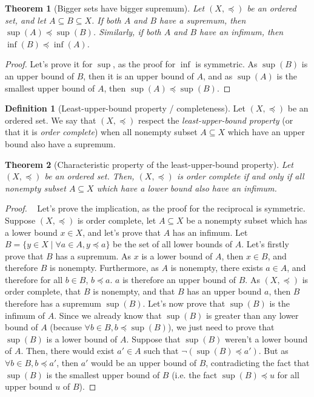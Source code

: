 \documentclass{article}
\newtheorem{theorem}{Theorem}[section]
\theoremstyle{definition}
\newtheorem{definition}{Definition}[section]
\theoremstyle{remark}
\theoremstyle{example}
\theoremstyle{notation}
\theoremstyle{axiom}
\begin{document}
\begin{theorem}[Bigger sets have bigger supremum] \label{thm:bigger-set-bigger-sup}
		Let $(X, \preceq)$ be an ordered set, and let $A \subseteq B \subseteq X$. If both $A$ and $B$ have a supremum, then $\sup(A) \preceq \sup(B)$. Similarly, if both $A$ and $B$ have an infimum, then $\inf(B) \preceq \inf(A)$.
\end{theorem}

\begin{proof}
		Let's prove it for $\sup$, as the proof for $\inf$ is symmetric. As $\sup(B)$ is an upper bound of $B$, then it is an upper bound of $A$, and as $\sup(A)$ is the smallest upper bound of $A$, then $\sup(A) \preceq \sup(B)$.
\end{proof}

\begin{definition}[Least-upper-bound property / completeness] %
		Let $(X, \preceq)$ be an ordered set. We say that $(X, \preceq)$ respect the \textit{least-upper-bound property} (or that it is \textit{order complete}) when all nonempty subset $A \subseteq X$ which have an upper bound also have a supremum.
\end{definition}

\begin{theorem}[Characteristic property of the least-upper-bound property]
		Let $(X, \preceq)$ be an ordered set. Then, $(X, \preceq)$ is order complete if and only if all nonempty subset $A \subseteq X$ which have a lower bound also have an infimum.
\end{theorem}

\begin{proof}~
		Let's prove the implication, as the proof for the reciprocal is symmetric. Suppose $(X, \preceq)$ is order complete, let $A \subseteq X$ be a nonempty subset which has a lower bound $x \in X$, and let's prove that $A$ has an infimum. Let $B = \{y \in X \mid \forall a \in A, y \preceq a\}$ be the set of all lower bounds of $A$. Let's firstly prove that $B$ has a supremum. As $x$ is a lower bound of $A$, then $x \in B$, and therefore $B$ is nonempty. Furthermore, as $A$ is nonempty, there exists $a \in A$, and therefore for all $b \in B$, $b \preceq a$. $a$ is therefore an upper bound of $B$. As $(X, \preceq)$ is order complete, that $B$ is nonempty, and that $B$ has an upper bound $a$, then $B$ therefore has a supremum $\sup(B)$. Let's now prove that $\sup(B)$ is the infimum of $A$. Since we already know that $\sup(B)$ is greater than any lower bound of $A$ (because $\forall b \in B, b \preceq \sup(B)$), we just need to prove that $\sup(B)$ is a lower bound of $A$. Suppose that $\sup(B)$ weren't a lower bound of $A$. Then, there would exist $a' \in A$ such that $\lnot(\sup(B) \preceq a')$. But as $\forall b \in B, b \preceq a'$, then $a'$ would be an upper bound of $B$, contradicting the fact that $\sup(B)$ is the smallest upper bound of $B$ (i.e. the fact $\sup(B) \preceq u$ for all upper bound $u$ of $B$).
\end{proof}
\end{document}
